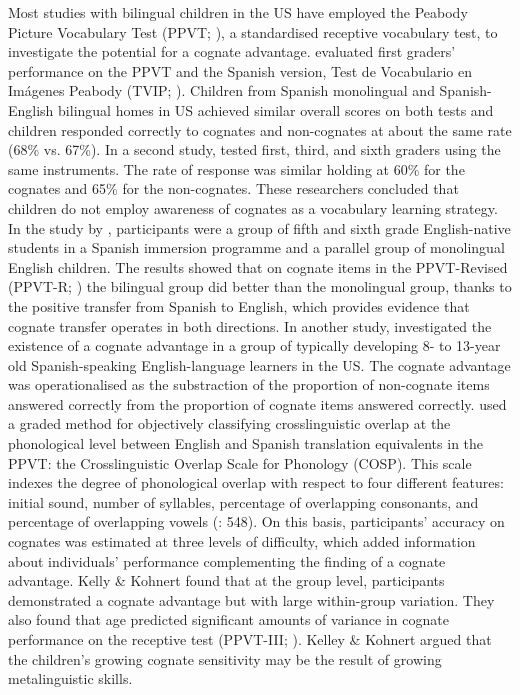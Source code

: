 \documentclass[output=paper,modfonts,nonflat,newtxmath]{langsci/langscibook}
\begin{document}
 {Most studies with bilingual children in the US have employed the Peabody Picture Vocabulary Test (PPVT; \citealt{DunnDunn1981, DunnDunn1997}), a standardised receptive vocabulary test, to investigate the potential for a cognate advantage. \citet{UmbelEtAl1992} evaluated first graders’ performance on the PPVT and the Spanish version, Test de Vocabulario en Imágenes Peabody (TVIP; \citealt{DunnEtAl1986}). Children from Spanish monolingual and Spanish-English bilingual homes in US achieved similar overall scores on both tests and children responded correctly to cognates and non-cognates at about the same rate (68\% vs. 67\%). In a second study, \citet{UmbelOller1994} tested first, third, and sixth graders using the same instruments. The rate of response was similar holding at 60\% for the cognates and 65\% for the non-cognates. These researchers concluded that children do not employ awareness of cognates as a vocabulary learning strategy. In the study by \citet{CunninghamGraham2000}, participants were a group of fifth and sixth grade English-native students in a Spanish immersion programme and a parallel group of monolingual English children. The results showed that on cognate items in the PPVT-Revised (PPVT-R; \citealt{DunnDunn1981}) the bilingual group did better than the monolingual group, thanks to the positive transfer from Spanish to English, which provides evidence that cognate transfer operates in both directions. In another study, \citet{KelleyKohnert2012} investigated the existence of a cognate advantage in a group of typically developing 8- to 13-year old Spanish-speaking English-language learners in the US. The cognate advantage was operationalised as the substraction of the proportion of non-cognate items answered correctly from the proportion of cognate items answered correctly. \citealt{KelleyKohnert2012} used a graded method for objectively classifying crosslinguistic overlap at the phonological level between English and Spanish translation equivalents in the PPVT: the Crosslinguistic Overlap Scale for Phonology (COSP). This scale indexes the degree of phonological overlap with respect to four different features: initial sound, number of syllables, percentage of overlapping consonants, and percentage of overlapping vowels (\citealt{KohnertEtAl2004}: 548). On this basis, participants’ accuracy on cognates was estimated at three levels of difficulty, which added information about individuals’ performance complementing the finding of a cognate advantage. Kelly \& Kohnert found that at the group level, participants demonstrated a cognate advantage but with large within-group variation. They also found that age predicted significant amounts of variance in cognate performance on the receptive test (PPVT-III; \citealt{DunnDunn1997}). Kelley \& Kohnert argued that the children’s growing cognate sensitivity may be the result of growing metalinguistic skills.}
\end{document}
